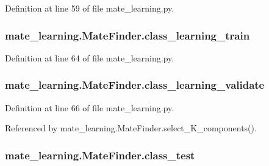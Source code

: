 Definition at line 59 of file mate\+\_\+learning.\+py.

\hypertarget{classmate__learning_1_1_mate_finder_affd9b58edbaaa1e91f130ce9fcef958e}{
\subsubsection[{class\+\_\+learning\+\_\+train}]{\setlength{\rightskip}{0pt plus 5cm}mate\+\_\+learning.\+Mate\+Finder.\+class\+\_\+learning\+\_\+train}}\label{classmate__learning_1_1_mate_finder_affd9b58edbaaa1e91f130ce9fcef958e}


Definition at line 64 of file mate\+\_\+learning.\+py.

\hypertarget{classmate__learning_1_1_mate_finder_a958fd7ea70befe493a1d7f3d383d50c6}{
\subsubsection[{class\+\_\+learning\+\_\+validate}]{\setlength{\rightskip}{0pt plus 5cm}mate\+\_\+learning.\+Mate\+Finder.\+class\+\_\+learning\+\_\+validate}}\label{classmate__learning_1_1_mate_finder_a958fd7ea70befe493a1d7f3d383d50c6}


Definition at line 66 of file mate\+\_\+learning.\+py.



Referenced by mate\+\_\+learning.\+Mate\+Finder.\+select\+\_\+\+K\+\_\+components().

\hypertarget{classmate__learning_1_1_mate_finder_a3fe8edaa8b6704d94252c2d1fc5b3360}{
\subsubsection[{class\+\_\+test}]{\setlength{\rightskip}{0pt plus 5cm}mate\+\_\+learning.\+Mate\+Finder.\+class\+\_\+test}}\label{classmate__learning_1_1_mate_finder_a3fe8edaa8b6704d94252c2d1fc5b3360}


